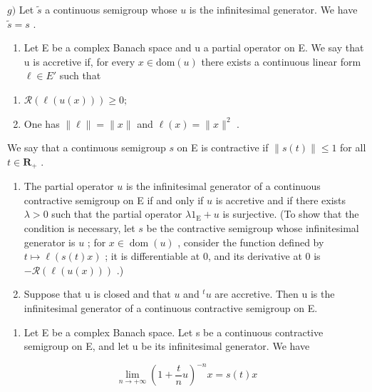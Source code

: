 \(g)\) Let \(\widetilde{s}\) a continuous semigroup whose \(u\) is the infinitesimal generator. We have \(\widetilde{s} = s\) .

\begin{enumerate}
\def\labelenumi{\arabic{enumi})}
\setcounter{enumi}{6}
\tightlist
\item
  Let E be a complex Banach space and u a partial operator on E. We say that u is accretive if, for every \(x \in \text{dom}(u)\) there exists a continuous linear form \(\ell \in E'\) such that
\end{enumerate}

\begin{enumerate}
\def\labelenumi{(\roman{enumi})}
\item
  \(\mathcal{R}(\ell(u(x))) \geqslant 0;\)
\item
  One has \(\|\ell\|=\|x\|\) and \(\ell(x)=\|x\|^{2}\) .
\end{enumerate}

We say that a continuous semigroup \(s\) on E is contractive if \(\|s(t)\|\leqslant1\) for all \(t\in\mathbf{R}_{+}\) .

\begin{enumerate}
\def\labelenumi{\alph{enumi})}
\item
  The partial operator \(u\) is the infinitesimal generator of a continuous contractive semigroup on E if and only if \(u\) is accretive and if there exists \(\lambda > 0\) such that the partial operator \(\lambda 1_{\mathrm{E}} + u\) is surjective. (To show that the condition is necessary, let \(s\) be the contractive semigroup whose infinitesimal generator is \(u\) ; for \(x \in \operatorname{dom}(u)\) , consider the function defined by \(t \mapsto \ell(s(t)x)\) ; it is differentiable at 0, and its derivative at 0 is \(-\mathcal{R}(\ell(u(x)))\) .)
\item
  Suppose that u is closed and that \(u\) and \(^{t}u\) are accretive. Then u is the infinitesimal generator of a continuous contractive semigroup on E.
\end{enumerate}

\begin{enumerate}
\def\labelenumi{\arabic{enumi})}
\setcounter{enumi}{7}
\tightlist
\item
  Let E be a complex Banach space. Let s be a continuous contractive semigroup on E, and let u be its infinitesimal generator. We have
\end{enumerate}

\[
\lim _ {n \to + \infty} \left(1 + \frac {t}{n} u\right) ^ {- n} x = s (t) x
\]

